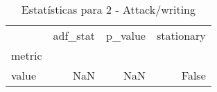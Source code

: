 \begin{table}[htbp]
\caption{Estatísticas para 2 - Attack/writing}
\label{tab:2_-_attack_writing_adf_test}
\begin{tabular}{lrrr}
\toprule
 & adf_stat & p_value & stationary \\
metric &  &  &  \\
\midrule
value & NaN & NaN & False \\
\bottomrule
\end{tabular}
\end{table}

